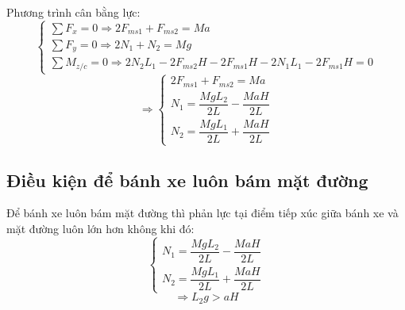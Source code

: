             \hspace*{0.6cm}Phương trình cân bằng lực:
            \begin{equation}
                \begin{cases}
                    \sum F_x = 0 \Rightarrow 2F_{ms1} + F_{ms2} = Ma \\
                    \sum F_y = 0 \Rightarrow 2N_1 + N_2 = Mg \\
                    \sum M_{z/c} = 0 \Rightarrow 2N_2L_1 - 2F_{ms2}H - 2F_{ms1}H - 2N_1L_1 - 2F_{ms1}H = 0
                \end{cases}
                \label{eq:3-1}
            \end{equation}
            \begin{equation}
                \Rightarrow
                \begin{cases}
                    2F_{ms1} + F_{ms2} = Ma  \\[0.2cm]
                    N_1 = \dfrac{MgL_2}{2L} - \dfrac{MaH}{2L} \\[0.2cm]
                    N_2 = \dfrac{MgL_1}{2L} + \dfrac{MaH}{2L}
                \end{cases}
                \label{eq:3-2}
            \end{equation}
        \subsection{Điều kiện để bánh xe luôn bám mặt đường}
            \hspace*{0.6cm}Để bánh xe luôn bám mặt đường thì phản lực tại điểm tiếp xúc giữa bánh xe và mặt đường luôn lớn hơn không khi đó:
            \begin{equation}
                \begin{cases}
                    N_1 = \dfrac{MgL_2}{2L} - \dfrac{MaH}{2L} \\[0.3cm]
                    N_2 = \dfrac{MgL_1}{2L} + \dfrac{MaH}{2L}
                \end{cases}
                \label{eq:3-3}
            \end{equation}
            \begin{equation}
                \Rightarrow
                L_{2}g > aH
                \label{eq:3-4}
            \end{equation}
